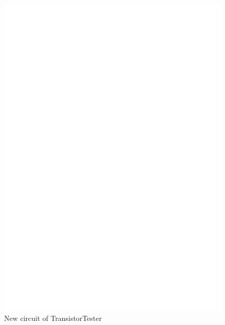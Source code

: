 \begin{figure}[H]
\centering
\includegraphics[width=18cm]{../FIG/ttester.eps}
\caption{New circuit of TransistorTester}
\label{fig:ttester}
\end{figure}

